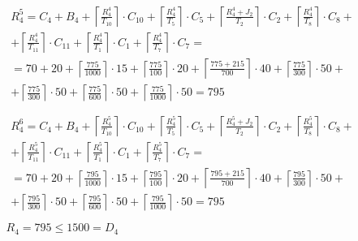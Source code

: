\begin{gather*}
  \begin{multlined}
    R_4^5 = C_4 + B_4 + \left\lceil\frac{R_4^4}{T_{10}}\right\rceil\cdot C_{10} + %
    \left\lceil\frac{R_4^4}{T_5}\right\rceil\cdot C_5 + %
    \left\lceil\frac{R_4^4 + J_2}{T_2}\right\rceil\cdot C_2 + %
    \left\lceil\frac{R_4^4}{T_8}\right\rceil\cdot C_8 + \\%
    + \left\lceil\frac{R_4^4}{T_{11}}\right\rceil\cdot C_{11} + %
    \left\lceil\frac{R_4^4}{T_1}\right\rceil\cdot C_1 +%
    \left\lceil\frac{R_4^4}{T_7}\right\rceil\cdot C_7 = \\%
    = 70 + 20 + \left\lceil\frac{775}{1000}\right\rceil\cdot 15 + %
    \left\lceil\frac{775}{100}\right\rceil\cdot 20 + %
    \left\lceil\frac{775 + 215}{700}\right\rceil\cdot 40 + %
    \left\lceil\frac{775}{300}\right\rceil\cdot 50 + \\%
    + \left\lceil\frac{775}{300}\right\rceil\cdot 50 + %
    \left\lceil\frac{775}{600}\right\rceil\cdot 50 + %
    \left\lceil\frac{775}{1000}\right\rceil\cdot 50 = 795 \\
  \end{multlined} \\
  \begin{multlined}
    R_4^6 = C_4 + B_4 + \left\lceil\frac{R_4^5}{T_{10}}\right\rceil\cdot C_{10} + %
    \left\lceil\frac{R_4^5}{T_5}\right\rceil\cdot C_5 + %
    \left\lceil\frac{R_4^5 + J_2}{T_2}\right\rceil\cdot C_2 + %
    \left\lceil\frac{R_4^5}{T_8}\right\rceil\cdot C_8 + \\%
    + \left\lceil\frac{R_4^5}{T_{11}}\right\rceil\cdot C_{11} + %
    \left\lceil\frac{R_4^5}{T_1}\right\rceil\cdot C_1 +%
    \left\lceil\frac{R_4^5}{T_7}\right\rceil\cdot C_7 = \\%
    = 70 + 20 + \left\lceil\frac{795}{1000}\right\rceil\cdot 15 + %
    \left\lceil\frac{795}{100}\right\rceil\cdot 20 + %
    \left\lceil\frac{795 + 215}{700}\right\rceil\cdot 40 + %
    \left\lceil\frac{795}{300}\right\rceil\cdot 50 + \\%
    + \left\lceil\frac{795}{300}\right\rceil\cdot 50 + %
    \left\lceil\frac{795}{600}\right\rceil\cdot 50 + %
    \left\lceil\frac{795}{1000}\right\rceil\cdot 50 = 795 \\
  \end{multlined} \\
  R_4 = 795 \le 1500 = D_4
\end{gather*}

